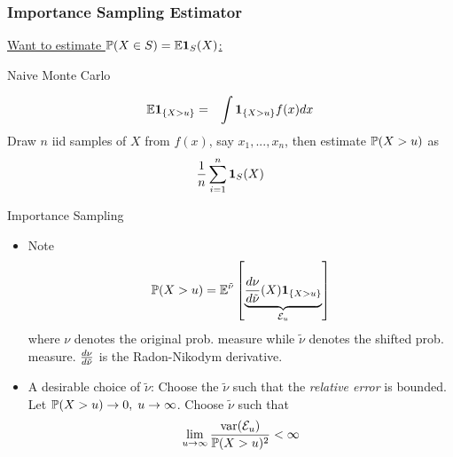 \documentclass{beamer}
\begin{document}
\begin{frame}
  \frametitle{Importance Sampling Estimator}
  \underline{\scriptsize{
      Want to estimate $\P(X \in S) = \E \I_S(X)$:}
  }

  \begin{minipage}[t]{0.45\linewidth}
    \textcolor[HTML]{990033}{Naive Monte Carlo}
    \begin{small}
      \begin{eqnarray*}
        \E \1{X > u} &=& \int \1{X > u} f(x) dx
      \end{eqnarray*}
      Draw $n$ iid samples of $X$ from $f(x)$, say $x_1, ..., x_n$,
      then estimate $\P(X > u)$ as
      \[
      {1 \over n} \sum_{i=1}^n \I_S(X)
      \]
    \end{small}
  \end{minipage}\hfill
  \begin{minipage}[t]{0.5\linewidth}
    \textcolor[HTML]{990033}{Importance Sampling}
    \begin{scriptsize}
    \begin{itemize}
    \item Note
      \[
      \P(X > u)
      =
      \E^{\tilde \nu} \left[
        \underbrace{
          \td{\nu}{\tilde \nu}(X) \1{X > u}
        }_{\mathcal E_u}
      \right]
      \]
      where $\nu$ denotes the original prob. measure while $\tilde \nu$
      denotes the shifted prob. measure. $\td{\nu}{\tilde \nu}$ is the
      Radon-Nikodym derivative.
    \item A desirable choice of $\tilde \nu$:
      Choose the $\tilde \nu$ such that the {\em relative error}
      is bounded. Let $\P(X > u) \to 0,\; u \to \infty$. Choose
      $\tilde \nu$ such that
      \[
      \lim_{u \to \infty} {\var({\mathcal E}_u) \over \P(X > u)^2} < \infty
      \]
    \end{itemize}
    \end{scriptsize}
  \end{minipage}
\end{frame}
\end{document}
